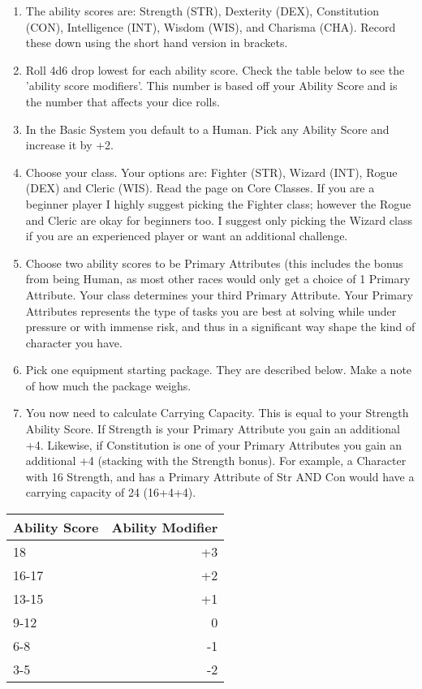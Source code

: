 \begin{multicols}{2}
\begin{enumerate}
    \item The ability scores are: Strength (STR), Dexterity (DEX), Constitution (CON), Intelligence (INT), Wisdom (WIS), and Charisma (CHA). Record these down using the short hand version in brackets. 
    \item Roll 4d6 drop lowest for each ability score. Check the table below to see the 'ability score modifiers'. This number is based off your Ability Score and is the number that affects your dice rolls. 
    \item In the Basic System you default to a Human. Pick any Ability Score and increase it by +2.  
    \item Choose your class. Your options are: Fighter (STR), Wizard (INT), Rogue (DEX) and Cleric (WIS). Read the page on Core Classes. If you are a beginner player I highly suggest picking the Fighter class; however the Rogue and Cleric are okay for beginners too. I suggest only picking the Wizard class if you are an experienced player or want an additional challenge.
    \item Choose two ability scores to be Primary Attributes (this includes the bonus from being Human, as most other races would only get a choice of 1 Primary Attribute. Your class determines your third Primary Attribute. Your Primary Attributes represents the type of tasks you are best at solving while under pressure or with immense risk, and thus in a significant way shape the kind of character you have.
    \item Pick one equipment starting package. They are described below. Make a note of how much the package weighs. 
    \item You now need to calculate Carrying Capacity. This is equal to your Strength Ability Score. If Strength is your Primary Attribute you gain an additional +4. Likewise, if Constitution is one of your Primary Attributes you gain an additional +4 (stacking with the Strength bonus). For example, a Character with 16 Strength, and has a Primary Attribute of Str AND Con would have a carrying capacity of 24 (16+4+4).
\end{enumerate}

\begin{tabular}{l | r}
    Ability Score & Ability Modifier \\
    \hline
    18 & +3 \\
    16-17 & +2 \\
    13-15 & +1 \\
    9-12 & 0 \\
    6-8 & -1 \\
    3-5 & -2 \\   
\end{tabular}


\end{multicols}
